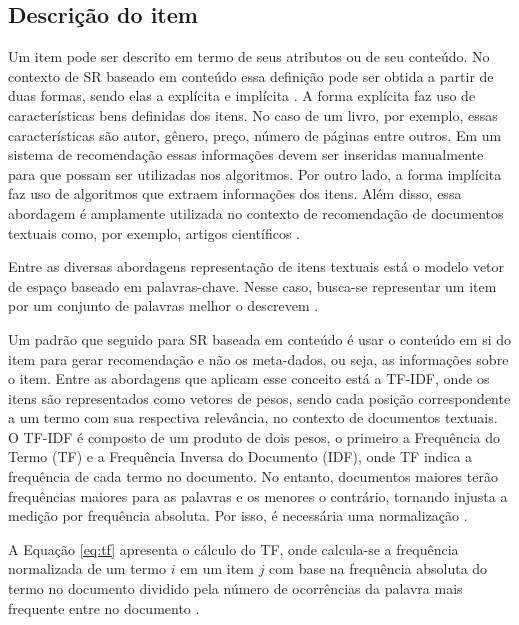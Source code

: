     \subsection{Descrição do item}
   
    Um item pode ser descrito em termo de seus atributos ou de seu conteúdo. No contexto de SR baseado em conteúdo essa definição pode ser obtida a partir de duas formas, sendo elas a explícita e implícita \cite{Jannach2010}. A forma explícita faz uso de características bens definidas dos itens. No caso de um livro, por exemplo, essas características são autor, gênero, preço, número de páginas entre outros. Em um sistema de recomendação essas informações devem ser inseridas manualmente para que possam ser utilizadas nos algoritmos. Por outro lado, a forma implícita faz uso de algoritmos que extraem informações dos itens. Além disso, essa abordagem é amplamente utilizada no contexto de recomendação de documentos textuais como, por exemplo, artigos científicos \cite{Garcia2013}.
    
    
    Entre as diversas abordagens representação de itens textuais está o modelo vetor de espaço baseado em palavras-chave. Nesse caso, busca-se representar um item por um conjunto de palavras melhor o descrevem \cite{Jannach2010}.
    
    Um padrão que seguido para SR baseada em conteúdo é usar o conteúdo em si do item para gerar recomendação e não os meta-dados, ou seja, as informações sobre o item. Entre as abordagens que aplicam esse conceito está a TF-IDF, onde os itens são representados como vetores de pesos, sendo cada posição correspondente a um termo com sua respectiva relevância, no contexto de documentos textuais. 
    O TF-IDF é composto de um produto de dois pesos, o primeiro a Frequência do Termo (TF) e a Frequência Inversa do Documento (IDF), onde TF indica a frequência de cada termo no documento. No entanto, documentos maiores terão frequências maiores para as palavras e os menores o contrário, tornando injusta a medição por frequência absoluta. Por isso, é necessária uma normalização \cite{Jannach2010}. 
    
    A Equação \ref{eq:tf} apresenta o cálculo do TF, onde calcula-se a frequência normalizada de um termo $i$ em um item $j$ com base na frequência absoluta do termo no documento dividido pela número de ocorrências da palavra mais frequente entre no documento \cite{Jannach2010}.
     
